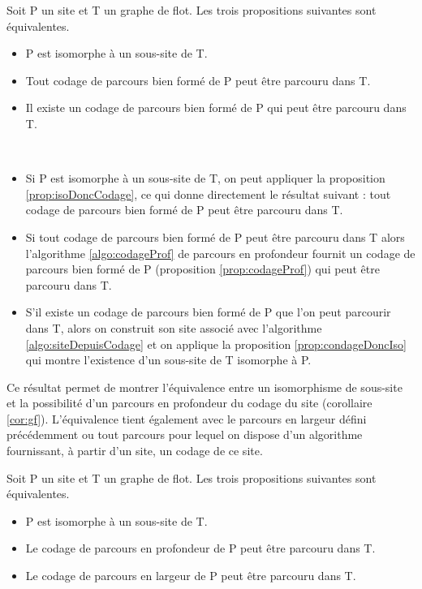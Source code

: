 \begin{theo}
 Soit P un site et T un graphe de flot. Les trois propositions suivantes sont équivalentes.
 \begin{itemize}
  \item P est isomorphe à un sous-site de T.
  \item Tout codage de parcours bien formé de P peut être parcouru dans T.
  \item Il existe un codage de parcours bien formé de P qui peut être parcouru dans T.
 \end{itemize}
\label{theo:eqIsoCodage}
\end{theo}

\begin{pr}
~
 \begin{itemize}
  \item Si P est isomorphe à un sous-site de T, on peut appliquer la proposition \ref{prop:isoDoncCodage}, ce qui donne directement le résultat suivant : tout codage de parcours bien formé de P peut être parcouru dans T.
  \item Si tout codage de parcours bien formé de P peut être parcouru dans T alors l'algorithme \ref{algo:codageProf} de parcours en profondeur fournit un codage de parcours bien formé de P (proposition \ref{prop:codageProf}) qui peut être parcouru dans T.
  \item S'il existe un codage de parcours bien formé de P que l'on peut parcourir dans T, alors on construit son site associé avec l'algorithme \ref{algo:siteDepuisCodage} et on applique la proposition \ref{prop:condageDoncIso} qui montre l'existence d'un sous-site de T isomorphe à P.
 \end{itemize}
\end{pr}

Ce résultat permet de montrer l'équivalence entre un isomorphisme de sous-site et la possibilité d'un parcours en profondeur du codage du site (corollaire \ref{cor:gf}).
L'équivalence tient également avec le parcours en largeur défini précédemment ou tout parcours pour lequel on dispose d'un algorithme fournissant, à partir d'un site, un codage de ce site.

\begin{cor}
 Soit P un site et T un graphe de flot. Les trois propositions suivantes sont équivalentes.
 \begin{itemize}
  \item P est isomorphe à un sous-site de T.
  \item Le codage de parcours en profondeur de P peut être parcouru dans T.
  \item Le codage de parcours en largeur de P peut être parcouru dans T.
 \end{itemize}
\label{cor:gf}
\end{cor}

